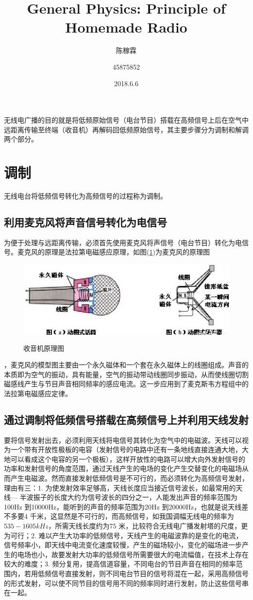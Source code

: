 \documentclass[10pt,a4paper]{article}
\title{General Physics: Principle of Homemade Radio}
\author{陈稼霖 \and 45875852}
\date{2018.6.6}
\theoremstyle{remark}
\begin{document}
\maketitle
无线电广播的目的就是将低频原始信号（电台节目）搭载在高频信号上后在空气中远距离传输至终端（收音机）再解码回低频原始信号，其主要步骤分为调制和解调两个部分。
\section{调制}
无线电台将低频信号转化为高频信号的过程称为调制。
\subsection{利用麦克风将声音信号转化为电信号}
为便于处理与远距离传输，必须首先使用麦克风将声信号（电台节目）转化为电信号。麦克风的原理是法拉第电磁感应原理，如图(\ref{principleOfMicrophone})为麦克风的原理图
\begin{figure}
  \centering
  \includegraphics{principleOfMicrophone.jpg}\\
  \caption{收音机原理图}\label{principleOfMicrophone}
\end{figure}
，麦克风的模型图主要由一个永久磁体和一个套在永久磁体上的线圈组成。声音的本质即为空气的振动，具有能量，空气的振动带动线圈同步振动，从而使线圈切割磁感线产生与节目声音相同频率的感应电流。这一步应用到了麦克斯韦方程组中的法拉第电磁感应定律。
\subsection{通过调制将低频信号搭载在高频信号上并利用天线发射}
要将信号发射出去，必须利用天线将电信号其转化为空气中的电磁波。天线可以视为一个带有开放性极板的电容（发射信号的电路中还有一条地线直接连通大地，大地可以看成这个电容的另一个极板），这样开放性的电路可以增大向外发射信号的功率和发射信号的角度范围，通过天线产生的电场的变化产生交替变化的电磁场从而产生电磁波。然而直接发射低频信号是不可行的，而必须转化为高频信号发射，理由有三：1. 为使发射效率足够高，天线长度应当接近信号波长，如最常用的天线--- 半波振子的长度大约为信号波长的四分之一，人能发出声音的频率范围为100Hz 到10000Hz，能听到的声音的频率范围为20Hz 到20000Hz，也就是说天线差不多要4 千米，这显然是不可行的，而高频信号，如我国调幅无线电的频率为$535-1605kHz$，所需天线长度约为$75$ 米，比较符合无线电广播发射塔的尺度，更为可行；2. 难以产生大功率的低频信号，天线产生的电磁波靠的是变化的电流，信号频率小，即天线中电流变化速度较慢，产生的磁场较小，变化的磁场进一步产生的电场也小，故要发射大功率的低频信号所需要很大的电流幅值，在技术上存在较大的难度；3. 频分复用，提高信道容量，不同电台的节目声音在相同的频率范围内，若用低频信号直接发射，则不同电台节目的信号将混在一起，采用高频信号的形式发射，可以使不同节目的信号用不同的频率同时进行发射，防止这些信号串在一起。
\end{document}
